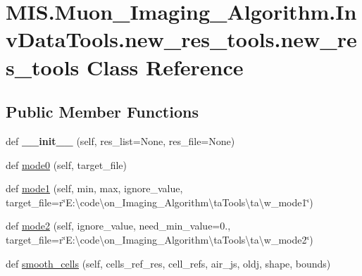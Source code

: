 \hypertarget{classMIS_1_1Muon__Imaging__Algorithm_1_1InvDataTools_1_1new__res__tools_1_1new__res__tools}{}\section{M\+I\+S.\+Muon\+\_\+\+Imaging\+\_\+\+Algorithm.\+Inv\+Data\+Tools.\+new\+\_\+res\+\_\+tools.\+new\+\_\+res\+\_\+tools Class Reference}
\label{classMIS_1_1Muon__Imaging__Algorithm_1_1InvDataTools_1_1new__res__tools_1_1new__res__tools}
\subsection*{Public Member Functions}
\begin{DoxyCompactItemize}
\item 
\mbox{\label{classMIS_1_1Muon__Imaging__Algorithm_1_1InvDataTools_1_1new__res__tools_1_1new__res__tools_aaa3a5be2763fff5136a6787728aa97c1}} 
def {\bfseries \+\_\+\+\_\+init\+\_\+\+\_\+} (self, res\+\_\+list=None, res\+\_\+file=None)
\item 
def \hyperlink{classMIS_1_1Muon__Imaging__Algorithm_1_1InvDataTools_1_1new__res__tools_1_1new__res__tools_a31bcee71c7f21292c97370854cccb7bc}{mode0} (self, target\+\_\+file)
\item 
def \hyperlink{classMIS_1_1Muon__Imaging__Algorithm_1_1InvDataTools_1_1new__res__tools_1_1new__res__tools_a76c9710a6bcfc392517f6979276eacc1}{mode1} (self, min, max, ignore\+\_\+value, target\+\_\+file=r\char`\"{}E\+:\textbackslash{}code\textbackslash{}on\+\_\+\+Imaging\+\_\+\+Algorithm\textbackslash{}ta\+Tools\textbackslash{}ta\textbackslash{}w\+\_\+mode1\char`\"{})
\item 
def \hyperlink{classMIS_1_1Muon__Imaging__Algorithm_1_1InvDataTools_1_1new__res__tools_1_1new__res__tools_a967906445a4866930a28b49a6d27360a}{mode2} (self, ignore\+\_\+value, need\+\_\+min\+\_\+value=0., target\+\_\+file=r\char`\"{}E\+:\textbackslash{}code\textbackslash{}on\+\_\+\+Imaging\+\_\+\+Algorithm\textbackslash{}ta\+Tools\textbackslash{}ta\textbackslash{}w\+\_\+mode2\char`\"{})
\item 
def \hyperlink{classMIS_1_1Muon__Imaging__Algorithm_1_1InvDataTools_1_1new__res__tools_1_1new__res__tools_a0ea3f101bb4ec0f248f57dcc838c71f3}{smooth\+\_\+cells} (self, cells\+\_\+ref\+\_\+res, cell\+\_\+refs, air\+\_\+js, oldj, shape, bounds)
\end{DoxyCompactItemize}
